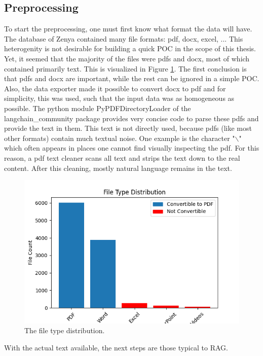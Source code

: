 \subsection{Preprocessing}
To start the preprocessing, one must first know what format the data will have. The database of Zenya contained many file formats: pdf, docx, excel, ... This heterogenity is not desirable for building a quick POC in the scope of this thesis. Yet, it seemed that the majority of the files were pdfs and docx, most of which contained primarily text. This is visualized in Figure \ref{fig:file_type_distribution}. The first conclusion is that pdfs and docx are important, while the rest can be ignored in a simple POC. Also, the data exporter made it possible to convert docx to pdf and for simplicity, this was used, such that the input data was as homogeneous as possible. The python module PyPDFDirectoryLoader of the langchain\_community package  provides very concise code to parse these pdfs and provide the text in them. This text is not directly used, because pdfs (like most other formats) contain much textual noise. One example is the character "$\backslash$" which often appears in places one cannot find visually inspecting the pdf. For this reason, a pdf text cleaner scans all text and strips the text down to the real content. After this cleaning, mostly natural language remains in the text.

\begin{figure}[H]
    \captionsetup{justification=centering}
    \centerline{\includegraphics[width=0.7\linewidth]{fig/file_type_distribution.png}}
    \caption{The file type distribution.}
    \label{fig:file_type_distribution}
\end{figure}

With the actual text available, the next steps are those typical to RAG. 

